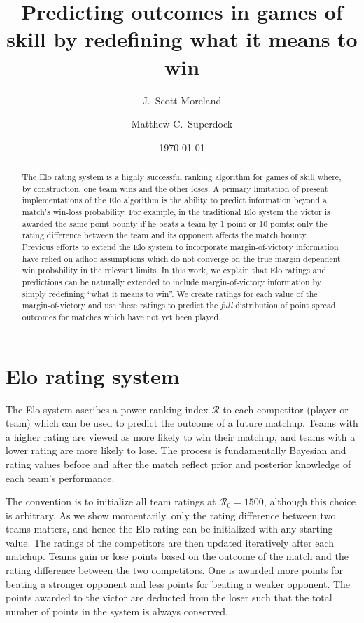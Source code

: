 \documentclass[aps,prc,reprint,amsmath,superscriptaddress]{revtex4-1}
\newcommand{\R}{\mathcal{R}}
\begin{document}
\title{Predicting outcomes in games of skill by redefining what it means to win}

\author{J.\ Scott Moreland}
\author{Matthew C.\ Superdock}

\date{\today}


\begin{abstract}
The Elo rating system is a highly successful ranking algorithm for games of skill where, by construction, one team wins and the other loses.
A primary limitation of present implementations of the Elo algorithm is the ability to predict information beyond a match's win-loss probability.
For example, in the traditional Elo system the victor is awarded the same point bounty if he beats a team by 1 point or 10 points; only the rating difference between the team and its opponent affects the match bounty.
Previous efforts to extend the Elo system to incorporate margin-of-victory information have relied on adhoc assumptions which do not converge on the true margin dependent win probability in the relevant limits.
In this work, we explain that Elo ratings and predictions can be naturally extended to include margin-of-victory information by simply redefining ``what it means to win''.
We create ratings for each value of the margin-of-victory and use these ratings to predict the \emph{full} distribution of point spread outcomes for matches which have not yet been played.
\end{abstract}


\maketitle

\section{Elo rating system}

The Elo system ascribes a power ranking index $\R$ to each competitor (player or team) which can be used to predict the outcome of a future matchup.
Teams with a higher rating are viewed as more likely to win their matchup, and teams with a lower rating are more likely to lose.
The process is fundamentally Bayesian and rating values before and after the match reflect prior and posterior knowledge of each team's performance.

The convention is to initialize all team ratings at ${\R_0 = 1500}$, although this choice is arbitrary.
As we show momentarily, only the rating difference between two teams matters, and hence the Elo rating can be initialized with any starting value.
The ratings of the competitors are then updated iteratively after each matchup.
Teams gain or lose points based on the outcome of the match and the rating difference between the two competitors.
One is awarded more points for beating a stronger opponent and less points for beating a weaker opponent.
The points awarded to the victor are deducted from the loser such that the total number of points in the system is always conserved.
\end{document}
